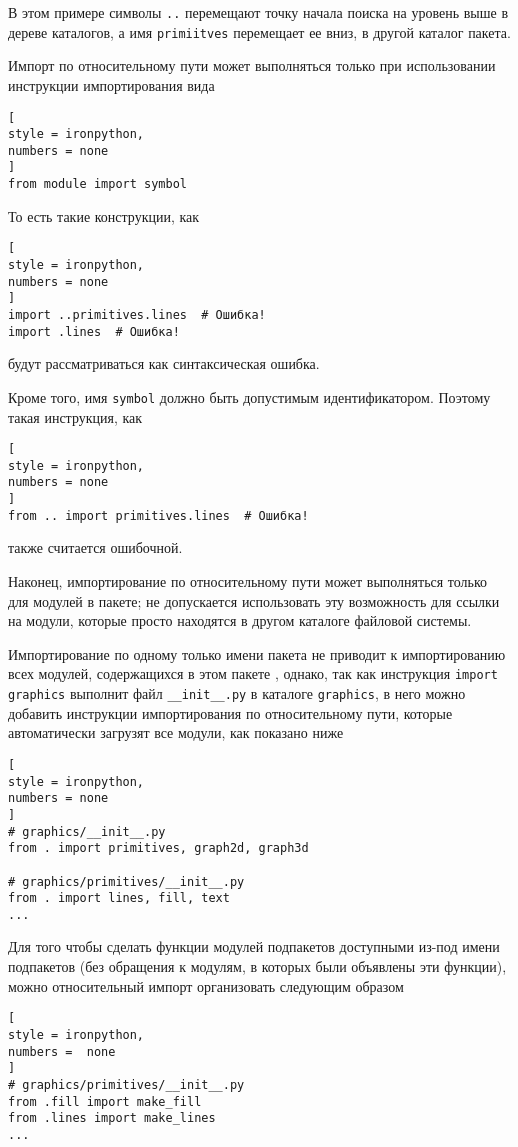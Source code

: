 \documentclass[%
	11pt,
	a4paper,
	utf8,
		]{article}
\begin{document}
В этом примере символы \texttt{..} перемещают точку начала поиска на уровень выше в дереве каталогов, а имя \texttt{primiitves} перемещает ее вниз, в другой каталог пакета.

Импорт по относительному пути может выполняться только при использовании инструкции импортирования вида
\begin{lstlisting}[
style = ironpython,
numbers = none
]
from module import symbol
\end{lstlisting}

То есть такие конструкции, как
\begin{lstlisting}[
style = ironpython,
numbers = none
]
import ..primitives.lines  # Ошибка!
import .lines  # Ошибка!
\end{lstlisting}
будут рассматриваться как синтаксическая ошибка.

Кроме того, имя \texttt{symbol} должно быть допустимым идентификатором. Поэтому такая инструкция, как 
\begin{lstlisting}[
style = ironpython,
numbers = none
]
from .. import primitives.lines  # Ошибка!
\end{lstlisting}
также считается ошибочной.

Наконец, импортирование по относительному пути может выполняться только для модулей в пакете; не допускается использовать эту возможность для ссылки на модули, которые просто находятся в другом каталоге файловой системы.

Импортирование по одному только имени пакета не приводит к импортированию всех модулей, содержащихся в этом пакете \cite[]{beazley:python-2010}, однако, так как инструкция \texttt{import graphics} выполнит файл \verb|__init__.py| в каталоге \texttt{graphics}, в него можно добавить инструкции импортирования по относительному пути, которые автоматически загрузят все модули, как показано ниже
\begin{lstlisting}[
style = ironpython,
numbers = none
]
# graphics/__init__.py
from . import primitives, graph2d, graph3d

# graphics/primitives/__init__.py
from . import lines, fill, text
...
\end{lstlisting}

Для того чтобы сделать функции модулей подпакетов доступными из-под имени подпакетов (без обращения к модулям, в которых были объявлены эти функции), можно относительный импорт организовать следующим образом
\begin{lstlisting}[
style = ironpython,
numbers =  none
]
# graphics/primitives/__init__.py
from .fill import make_fill
from .lines import make_lines
...
\end{lstlisting}
\end{document}
